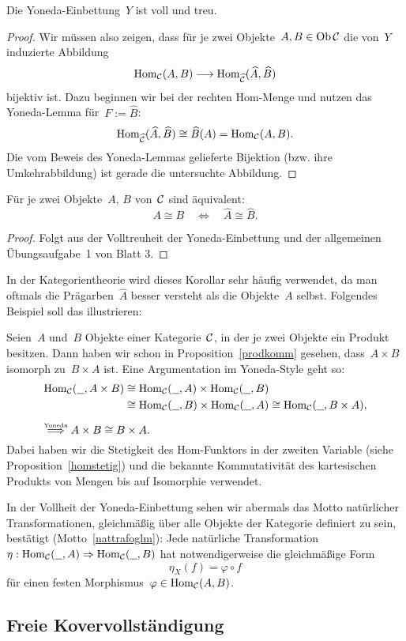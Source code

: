 \begin{kor}Die Yoneda-Einbettung~$Y$ ist voll und treu.\end{kor}
\begin{proof}
Wir müssen also zeigen, dass für je zwei Objekte~$A,B \in \operatorname{Ob}\mathcal{C}$ die von~$Y$
induzierte Abbildung
\[ \mathrm{Hom}_{\mathcal{C}}(A,B) \longrightarrow \mathrm{Hom}_{\widehat{\mathcal{C}}}(\widehat A,\widehat B) \]
bijektiv ist. Dazu beginnen wir bei der rechten Hom-Menge und nutzen das
Yoneda-Lemma für~$F := \widehat B$:
\[ \mathrm{Hom}_{\widehat{\mathcal{C}}}(\widehat A,\widehat B) \cong \widehat B(A) = \mathrm{Hom}_{\mathcal{C}}(A,B). \]
Die vom Beweis des Yoneda-Lemmas gelieferte Bijektion (bzw. ihre
Umkehrabbildung) ist gerade die untersuchte Abbildung.
\end{proof}

\begin{kor}Für je zwei Objekte~$A$, $B$ von~$\mathcal{C}$ sind äquivalent:
\[ A \cong B \quad\Longleftrightarrow\quad \widehat A \cong \widehat B. \]
\end{kor}
\begin{proof}Folgt aus der Volltreuheit der Yoneda-Einbettung und der
allgemeinen Übungs\-auf\-ga\-be~1 von Blatt 3.\end{proof}

In der Kategorientheorie wird dieses Korollar sehr häufig verwendet, da man
oftmals die Prägarben~$\widehat A$ besser versteht als die Objekte~$A$ selbst.
Folgendes Beispiel soll das illustrieren:
\begin{bsp}Seien~$A$ und~$B$ Objekte einer Kategorie~$\mathcal{C}$, in der je zwei
Objekte ein Produkt besitzen. Dann haben wir schon in Proposition~\ref{prodkomm}
gesehen, dass~$A \times B$ isomorph zu~$B \times A$ ist. Eine Argumentation im
Yoneda-Style geht so:
\begin{align*}
  \Hom_\C(\freist, A \times B) &\cong
  \Hom_\C(\freist, A) \times \Hom_\C(\freist, B) \\
  &\cong \Hom_\C(\freist, B) \times \Hom_\C(\freist, A) \cong
  \Hom_\C(\freist, B \times A), \\[0.5em]
  \omit\rlap{$\stackrel{\text{\tiny Yoneda}}{\Longrightarrow} A \times B \cong B \times A.$}
\end{align*}
Dabei haben wir die Stetigkeit des Hom-Funktors in der zweiten Variable (siehe
Proposition~\ref{homstetig}) und die bekannte Kommutativität des kartesischen
Produkts von Mengen bis auf Isomorphie verwendet.
\end{bsp}

\begin{bem}In der Vollheit der Yoneda-Einbettung sehen wir abermals das Motto
natürlicher Transformationen, gleichmäßig über alle Objekte der Kategorie
definiert zu sein, bestätigt (Motto~\ref{nattrafoglm}): Jede natürliche
Transformation~$\eta : \mathrm{Hom}_{\mathcal{C}}(\underline{\ \ },A) \Rightarrow \mathrm{Hom}_{\mathcal{C}}(\underline{\ \ },B)$ hat
notwendigerweise die gleichmäßige Form
\[ \eta_X(f) = \varphi \circ f \]
für einen festen Morphismus~$\varphi \in \mathrm{Hom}_{\mathcal{C}}(A,B)$.\end{bem}


\subsection{Freie Kovervollständigung}


